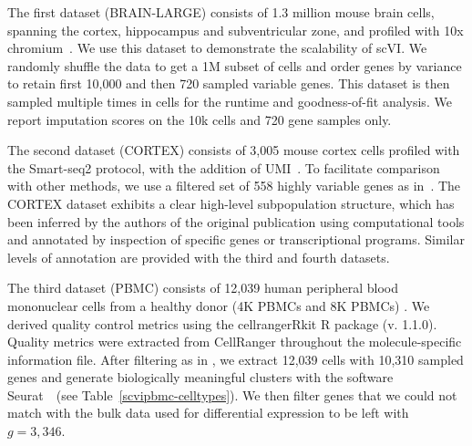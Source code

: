 The first dataset (BRAIN-LARGE) consists of 1.3 million mouse brain cells, spanning the cortex, hippocampus and subventricular zone, and profiled with 10x chromium~\cite{10x}. We use this dataset to demonstrate the scalability of scVI. We randomly shuffle the data to get a 1M subset of cells and order genes by variance to retain first 10,000 and then 720 sampled variable genes. This dataset is then sampled multiple times in cells for the runtime and goodness-of-fit analysis. We report imputation scores on the 10k cells and 720 gene samples only.

The second dataset (CORTEX) consists of 3,005 mouse cortex cells profiled with the Smart-seq2 protocol, with the addition of UMI~\cite{Zeisel1138}. To facilitate comparison with other methods, we use a filtered set of 558 highly variable genes as in~\cite{biscuit}. The CORTEX dataset exhibits a clear high-level subpopulation structure, which has been inferred by the authors of the original publication using computational tools and annotated by inspection of specific genes or transcriptional programs. Similar levels of annotation are provided with the third and fourth datasets. 
    
    
The third dataset (PBMC) consists of 12,039 human peripheral blood mononuclear cells from a healthy donor (4K PBMCs and 8K PBMCs) \cite{Zheng2017}. We derived quality control metrics using the cellrangerRkit R package (v. 1.1.0). Quality metrics were extracted from CellRanger throughout the molecule-specific information file. After filtering as in \cite{SCONE}, we extract 12,039 cells with 10,310 sampled genes and generate biologically meaningful clusters with the software Seurat~\cite{SEURAT}~(see Table~\ref{scvipbmc-celltypes}). We then filter genes that we could not match with the bulk data used for differential expression to be left with $g = 3,346$. 

